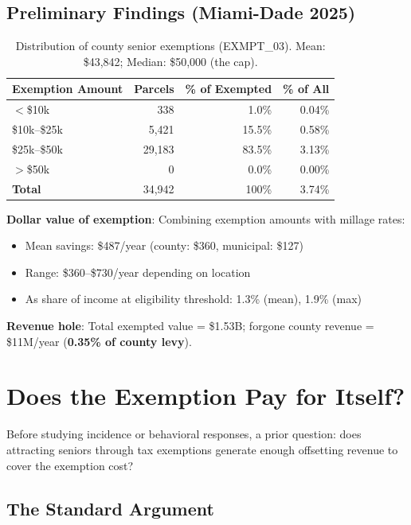 \documentclass[11pt]{article}
\begin{document}
\subsection{Preliminary Findings (Miami-Dade 2025)}

\begin{table}[h]
\centering
\begin{tabular}{lrrr}
\toprule
Exemption Amount & Parcels & \% of Exempted & \% of All \\
\midrule
$<$\$10k & 338 & 1.0\% & 0.04\% \\
\$10k--\$25k & 5,421 & 15.5\% & 0.58\% \\
\$25k--\$50k & 29,183 & 83.5\% & 3.13\% \\
$>$\$50k & 0 & 0.0\% & 0.00\% \\
\midrule
\textbf{Total} & 34,942 & 100\% & 3.74\% \\
\bottomrule
\end{tabular}
\caption{Distribution of county senior exemptions (EXMPT\_03). Mean: \$43,842; Median: \$50,000 (the cap).}
\end{table}

\textbf{Dollar value of exemption}: Combining exemption amounts with millage rates:
\begin{itemize}
    \item Mean savings: \$487/year (county: \$360, municipal: \$127)
    \item Range: \$360--\$730/year depending on location
    \item As share of income at eligibility threshold: 1.3\% (mean), 1.9\% (max)
\end{itemize}

\textbf{Revenue hole}: Total exempted value = \$1.53B; forgone county revenue = \$11M/year (\textbf{0.35\% of county levy}).

\section{Does the Exemption Pay for Itself?}

Before studying incidence or behavioral responses, a prior question: does attracting seniors through tax exemptions generate enough offsetting revenue to cover the exemption cost?

\subsection{The Standard Argument}
\end{document}
